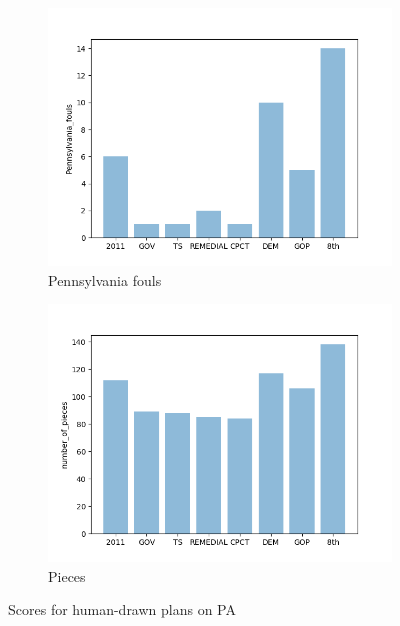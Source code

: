 \documentclass{mgggarticle}
\begin{document}
\begin{figure}
\begin{subfigure}{0.4\textwidth}
\centering
\includegraphics[width=\textwidth]{bars/Pennsylvania_fouls_bar.png}
\caption{Pennsylvania fouls}
\end{subfigure}
\begin{subfigure}{0.4\textwidth}
\centering
\includegraphics[width=\textwidth]{bars/number_of_pieces_bar.png}
\caption{Pieces}
\end{subfigure}
\caption{Scores for human-drawn plans on PA}
\end{figure}

\end{document}
